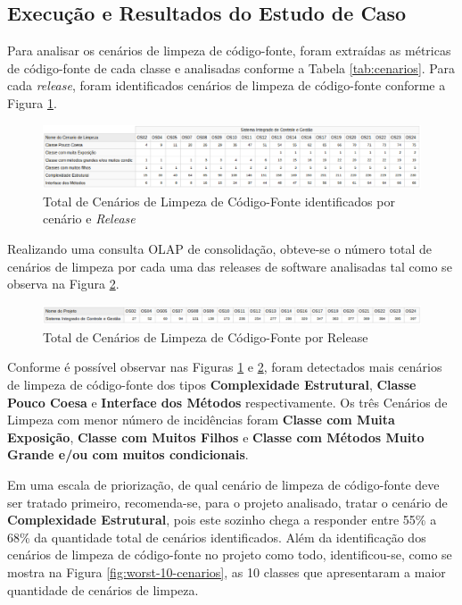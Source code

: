 \subsection{Execução e Resultados do Estudo de Caso}
\label{sec:resultados}
Para analisar os cenários de limpeza de código-fonte, foram extraídas as métricas de código-fonte de cada classe e analisadas conforme a Tabela \ref{tab:cenarios}. Para cada \textit{release}, foram identificados cenários de limpeza de código-fonte conforme a Figura \ref{fig:cenarios-release}.


\begin{figure}[ht!]
\centering
\includegraphics[keepaspectratio=true,scale=0.43]{figuras/total-cenario-tipo.eps}
\caption{Total de Cenários de Limpeza de Código-Fonte identificados por cenário e \textit{Release}}
\label{fig:cenarios-release}
\end{figure}
\FloatBarrier


Realizando uma consulta OLAP de consolidação, obteve-se o número total de cenários de limpeza por cada uma das releases de software analisadas tal como se observa na Figura \ref{fig:cenarios-total}.

\begin{figure}[ht!]
\centering
\includegraphics[keepaspectratio=true,scale=0.45]{figuras/total-cenarios-release.eps}
\caption{Total de Cenários de Limpeza de Código-Fonte por Release}
\label{fig:cenarios-total}
\end{figure}
\FloatBarrier

Conforme é possível observar nas Figuras \ref{fig:cenarios-release} e \ref{fig:cenarios-total}, foram detectados mais cenários de limpeza de código-fonte dos tipos \textbf{Complexidade Estrutural}, \textbf{Classe Pouco Coesa} e \textbf{Interface dos Métodos} respectivamente. Os três Cenários de Limpeza com menor número de incidências foram \textbf{Classe com Muita Exposição}, \textbf{Classe com Muitos Filhos} e \textbf{Classe com Métodos Muito Grande e/ou com muitos condicionais}.

Em uma escala de priorização, de qual cenário de limpeza de código-fonte deve ser tratado primeiro, recomenda-se, para o projeto analisado, tratar o cenário de \textbf{Complexidade Estrutural}, pois este sozinho chega a responder entre 55\% a 68\% da quantidade total de cenários identificados. Além da identificação dos cenários de limpeza de código-fonte no projeto como todo, identificou-se, como se mostra na Figura \ref{fig:worst-10-cenarios}, as 10 classes que apresentaram a maior quantidade de cenários de limpeza.


